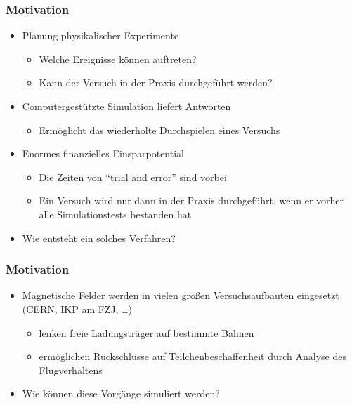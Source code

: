 \mode*
\begin{frame}
  \frametitle{Motivation}
  \begin{itemize}
    \item Planung physikalischer Experimente
    \begin{itemize}
      \item Welche Ereignisse k\"onnen auftreten?
      \item Kann der Versuch in der Praxis durchgef\"uhrt werden?
    \end{itemize}
    \item Computergest\"utzte Simulation liefert Antworten
      \begin{itemize}
        \item Erm\"oglicht das wiederholte Durchspielen eines Versuchs
      \end{itemize}
    \item Enormes finanzielles Einsparpotential
      \begin{itemize}
        \item Die Zeiten von "`trial and error"' sind vorbei
        \item Ein Versuch wird nur dann in der Praxis durchgef\"uhrt,
          wenn er vorher alle Simulationstests bestanden hat
      \end{itemize}
    \item Wie entsteht ein solches Verfahren?
  \end{itemize}
\end{frame}

\begin{frame}
  \frametitle{Motivation}
  \begin{itemize}
    \item Magnetische Felder werden in vielen gro{\ss}en
      Versuchsaufbauten eingesetzt (CERN, IKP am FZJ, \ldots)
    \begin{itemize}
      \item lenken freie Ladungstr\"ager auf bestimmte Bahnen
      \item erm\"oglichen R\"uckschl\"usse auf Teilchenbeschaffenheit
        durch Analyse des Flugverhaltens
    \end{itemize}
    \item Wie k\"onnen diese Vorg\"ange simuliert werden?
  \end{itemize}
\end{frame}

